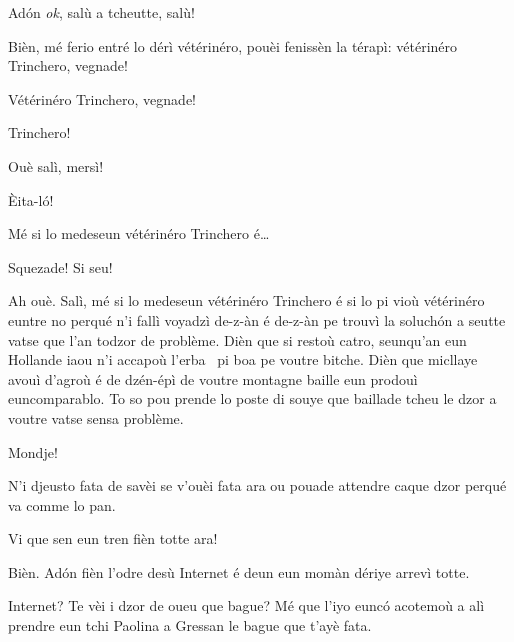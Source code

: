 \begin{drama}
\Mariettospeaks Ad\'on \textit{ok}, salù a tcheutte, salù!



\Chefspeaks Bièn, mé ferio entré lo dérì vétérinéro, pouèi fenissèn la térapì: vétérinéro Trinchero, vegnade!


\Chefspeaks Vétérinéro Trinchero, vegnade!


\Tuttispeaks{} Trinchero!


\Trincherospeaks{} Ouè salì, mersì!

\Mariettospeaks \`Eita-l\'o!

\Trincherospeaks{} Mé si lo medeseun vétérinéro Trinchero é\ldots

\Cienspeaks Squezade! Si seu!


\Trincherospeaks Ah ouè.  Salì, mé si lo medeseun vétérinéro Trinchero é si lo pi vioù vétérinéro euntre no perqué n’i fallì voyadzì de-z-àn é de-z-àn pe trouvì la soluch\'on a seutte vatse que l’an todzor de problème. Dièn que si restoù catro, seunqu'an eun Hollande iaou n’i accapoù l’erba \cannabis\ pi boa pe voutre bitche. Dièn que micllaye avouì d’agroù é de dzén-épì de voutre montagne baille eun prodouì euncomparablo. To so pou prende lo poste di souye que ba\-illa\-de tcheu le dzor a voutre vatse sensa problème.

\Cienspeaks Mondje!

\Trincherospeaks N’i djeusto fata de savèi se v'ouèi fata ara ou pouade attendre caque dzor perqué va comme lo pan.

\Cienspeaks Vi que sen eun tren fièn totte ara!

\Trincherospeaks Bièn. Ad\'on fièn l’odre desù Internet é deun eun mo\-màn dériye arrevì totte.


\Cienspeaks {} Internet? Te vèi i dzor de oueu que bague? Mé que l'iyo eunc\'o acotemoù a alì prendre eun tchi Paolina a Gressan le bague que t’ayè fata. 


\end{drama}
